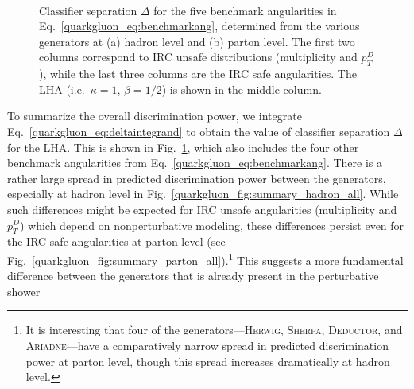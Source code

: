 \documentclass[11pt]{cernrep}
\begin{document}
\begin{figure}
\centering
{}
$\qquad$
\caption{Classifier separation $\Delta$ for the five benchmark angularities in Eq.~\eqref{quarkgluon_eq:benchmarkang}, determined from the various generators at (a) hadron level and (b) parton level.  The first two columns correspond to IRC unsafe distributions (multiplicity and $p_T^D$), while the last three columns are the IRC safe angularities.  The LHA (i.e.~$\kappa = 1$, $\beta = 1/2$) is shown in the middle column.}
\label{quarkgluon_fig:summary_all}
\end{figure}

To summarize the overall discrimination power, we integrate
Eq.~\eqref{quarkgluon_eq:deltaintegrand} to obtain the value of
classifier separation $\Delta$ for the LHA.  This is shown in
Fig.~\ref{quarkgluon_fig:summary_all}, which also includes the four
other benchmark angularities from
Eq.~\eqref{quarkgluon_eq:benchmarkang}.  There is a rather large
spread in predicted discrimination power between the generators,
especially at hadron level in
Fig.~\ref{quarkgluon_fig:summary_hadron_all}.  While such differences
might be expected for IRC unsafe angularities (multiplicity and
$p_T^D$) which depend on nonperturbative modeling, these differences
persist even for the IRC safe angularities at parton level (see
Fig.~\ref{quarkgluon_fig:summary_parton_all}).\footnote{It is interesting that four of the generators---\textsc{Herwig}, \textsc{Sherpa}, \textsc{Deductor}, and \textsc{Ariadne}---have a comparatively narrow spread in predicted discrimination power at parton level, though this spread increases dramatically at hadron level.}  This suggests a more
fundamental difference between the generators that is already present
in the perturbative shower
\end{document}
